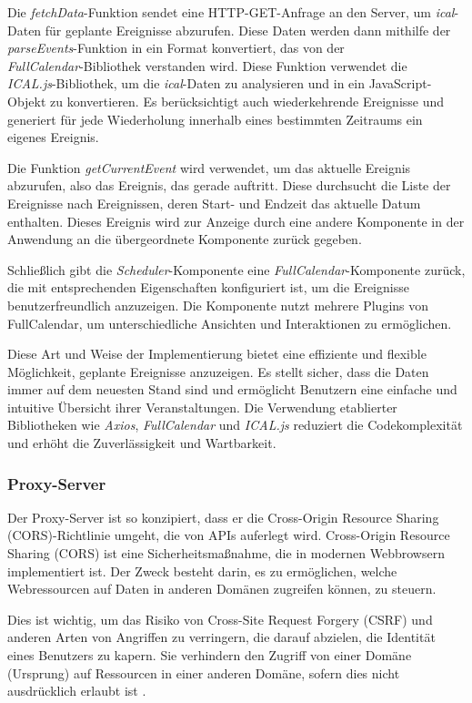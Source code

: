 Die \emph{fetchData}-Funktion sendet eine HTTP-GET-Anfrage an den Server, um \emph{ical}-Daten für geplante Ereignisse abzurufen. Diese Daten werden dann mithilfe der\\ \emph{parseEvents}-Funktion in ein Format konvertiert, das von der\\ \emph{FullCalendar}-Bibliothek verstanden wird. Diese Funktion verwendet die\\ \emph{ICAL.js}-Bibliothek, um die \emph{ical}-Daten zu analysieren und in ein JavaScript-Objekt zu konvertieren. Es berücksichtigt auch wiederkehrende Ereignisse und generiert für jede Wiederholung innerhalb eines bestimmten Zeitraums ein eigenes Ereignis.

Die Funktion \emph{getCurrentEvent} wird verwendet, um das aktuelle Ereignis abzurufen, also das Ereignis, das gerade auftritt. Diese durchsucht die Liste der Ereignisse nach Ereignissen, deren Start- und Endzeit das aktuelle Datum enthalten. Dieses Ereignis wird zur Anzeige durch eine andere Komponente in der Anwendung an die übergeordnete Komponente zurück gegeben.

Schließlich gibt die \emph{Scheduler}-Komponente eine \emph{FullCalendar}-Komponente zurück, die mit entsprechenden Eigenschaften konfiguriert ist, um die Ereignisse benutzerfreundlich anzuzeigen. Die Komponente nutzt mehrere Plugins von FullCalendar, um unterschiedliche Ansichten und Interaktionen zu ermöglichen.

Diese Art und Weise der Implementierung bietet eine effiziente und flexible Möglichkeit, geplante Ereignisse anzuzeigen. Es stellt sicher, dass die Daten immer auf dem neuesten Stand sind und ermöglicht Benutzern eine einfache und intuitive Übersicht ihrer Veranstaltungen. Die Verwendung etablierter Bibliotheken wie \emph{Axios}, \emph{FullCalendar} und \emph{ICAL.js} reduziert die Codekomplexität und erhöht die Zuverlässigkeit und Wartbarkeit.

\subsubsection{Proxy-Server}
Der Proxy-Server ist so konzipiert, dass er die Cross-Origin Resource Sharing (CORS)-Richtlinie umgeht, die von APIs auferlegt wird. Cross-Origin Resource Sharing (CORS) ist eine Sicherheitsmaßnahme, die in modernen Webbrowsern implementiert ist. Der Zweck besteht darin, es zu ermöglichen, welche Webressourcen auf Daten in anderen Domänen zugreifen können, zu steuern.

Dies ist wichtig, um das Risiko von Cross-Site Request Forgery (CSRF) und anderen Arten von Angriffen zu verringern, die darauf abzielen, die Identität eines Benutzers zu kapern. Sie verhindern den Zugriff von einer Domäne (Ursprung) auf Ressourcen in einer anderen Domäne, sofern dies nicht ausdrücklich erlaubt ist \cite{ionos-de}.

